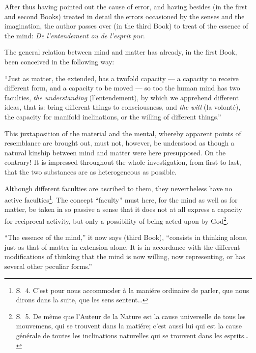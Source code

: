 \documentclass[12pt,a4paper]{article}
\begin{document}
After thus having pointed out the cause of error, and having besides (in the
first and second Books) treated in detail the errors occasioned by the senses and
the imagination, the author passes over (in the third Book) to treat of the
essence of the mind: \emph{De l'entendement ou de l'esprit pur}.

The general relation between mind and matter has already, in the first Book, been
conceived in the following way:

``Just as matter, the extended, has a twofold capacity --- a capacity to receive
different form, and a capacity to be moved --- so too the human mind has two
faculties, \emph{the understanding} (l'entendement), by which we apprehend
different ideas, that is: bring different things to consciousness, and \emph{the
will} (la volonté), the capacity for manifold inclinations, or the willing of
different things.''

This juxtaposition of the material and the mental, whereby apparent points of
resemblance are brought out, must not, however, be understood as though a natural
kinship between mind and matter were here presupposed. On the contrary! It is
impressed throughout the whole investigation, from first to last, that the two
substances are as heterogeneous as possible.

Although different faculties are ascribed to them, they nevertheless have no
active faculties\footnote{S.~4. C'est pour nous accommoder à la maniére ordinaire
de parler, que nous dirons dans la suite, que les sens sentent\dots}. The
concept ``faculty'' must here, for the mind as well as for matter, be taken in so
passive a sense that it does not at all express a capacity for reciprocal
activity, but only a possibility of being acted upon by God\footnote{S.~5. De même
que l'Auteur de la Nature est la cause universelle de tous les mouvemens, qui se
trouvent dans la matiére; c'est aussi lui qui est la cause générale de toutes les
inclinations naturelles qui se trouvent dans les esprits\dots}.

``The essence of the mind,'' it now says (third Book), ``consists in thinking
alone, just as that of matter in extension alone. It is in accordance with the
different modifications of thinking that the mind is now willing, now
representing, or has several other peculiar forms.''
\end{document}
